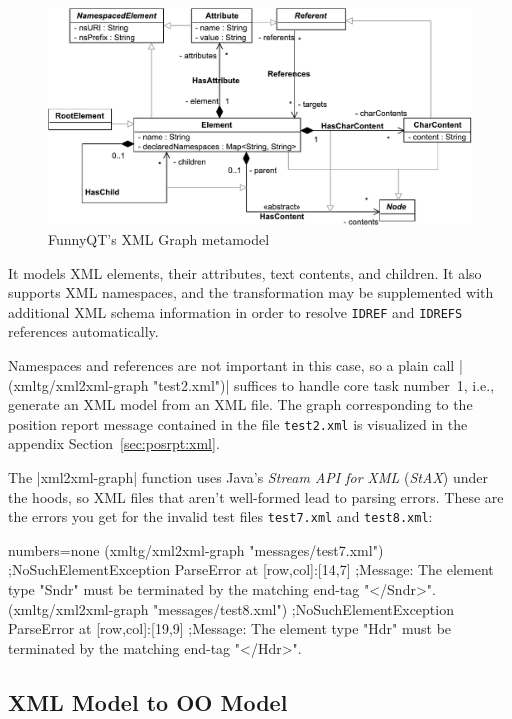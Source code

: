 \documentclass[a4paper]{article}
\newcommand{\code}{\clojureinline}
\begin{document}
\begin{figure}[h!t]
  \centering
  \includegraphics[width=.8\textwidth]{xml-schema}
  \caption{FunnyQT's XML Graph metamodel}
  \label{fig:xml-mm}
\end{figure}

It models XML elements, their attributes, text contents, and children.  It also
supports XML namespaces, and the transformation may be supplemented with
additional XML schema information in order to resolve \texttt{IDREF} and
\texttt{IDREFS} references automatically.

\begin{sloppypar}
  Namespaces and references are not important in this case, so a plain call
  \code|(xmltg/xml2xml-graph "test2.xml")| suffices to handle core task
  number~1, i.e., generate an XML model from an XML file.  The graph
  corresponding to the position report message contained in the file
  \texttt{test2.xml} is visualized in the appendix
  Section~\ref{sec:posrpt:xml}.
\end{sloppypar}

The \code|xml2xml-graph| function uses Java's \emph{Stream API for XML}
(\emph{StAX}) under the hoods, so XML files that aren't well-formed lead to
parsing errors.  These are the errors you get for the invalid test files
\texttt{test7.xml} and \texttt{test8.xml}:

\begin{clojurecode*}{numbers=none}
(xmltg/xml2xml-graph "messages/test7.xml")
;NoSuchElementException ParseError at [row,col]:[14,7]
;Message: The element type "Sndr" must be terminated by the matching end-tag "</Sndr>".
(xmltg/xml2xml-graph "messages/test8.xml")
;NoSuchElementException ParseError at [row,col]:[19,9]
;Message: The element type "Hdr" must be terminated by the matching end-tag "</Hdr>".
\end{clojurecode*}


\subsection{XML Model to OO Model}
\label{sec:xml-to-oo}
\end{document}
